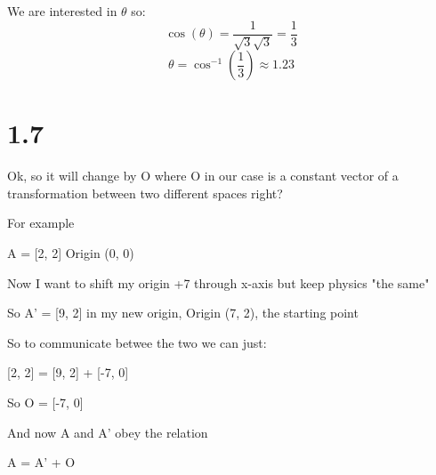 \documentclass{article}
\begin{document}
We are interested in \(\theta\) so:
\begin{equation*}
    \cos(\theta) = \frac{1}{\sqrt{3}\sqrt{3}} = \frac{1}{3}
\end{equation*}
\begin{equation*}
    \theta = \cos^{-1}(\frac{1}{3}) \approx 1.23
\end{equation*}

\section*{1.7}

Ok, so it will change by O where O
in our case is a constant vector of a transformation between two different spaces right?

For example

A = [2, 2] Origin (0, 0)

Now I want to shift my origin +7 through x-axis but keep physics "the same"

So A' = [9, 2] in my new origin, Origin (7, 2), the starting point

So to communicate betwee the two we can just:

[2, 2] = [9, 2] + [-7, 0]

So O = [-7, 0]

And now A and A' obey the relation

A = A' + O
\end{document}
